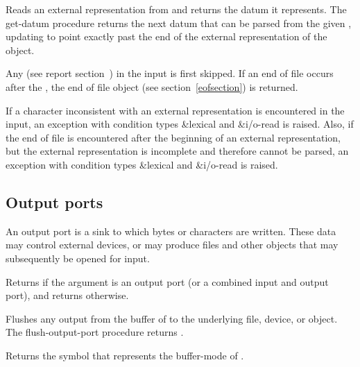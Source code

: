 \begin{entry}{%
}
 
Reads an external representation from  and returns the
datum it represents.  The {\cf get-datum} procedure returns the next
datum that can be parsed from the given , updating
 to point exactly past the end of the external
representation of the object.

Any 
(see report section~) in
the input is first skipped.  If an end of file occurs after the
, the end of file object (see
section~\ref{eofsection}) is returned.

If a character inconsistent with an external representation is
encountered in the input, an exception with condition types
{\cf\&lexical} and {\cf\&i/o-read} is raised.
Also, if the end of file is encountered
after the beginning of an external representation, but the external
representation is incomplete and therefore cannot be parsed, an exception
with condition types {\cf\&lexical} and {\cf\&i/o-read} is raised.
\end{entry}

\subsection{Output ports}

An output port is a sink to which bytes or characters are written.
These data may control
external devices, or may produce files and other objects that may
subsequently be opened for input.

\begin{entry}{%
}
   
Returns \schtrue{} if the argument is an output port (or a
combined input and output port), and returns \schfalse{} otherwise.
\end{entry}   

\begin{entry}{%
}
   
Flushes any output from the buffer of  to the
underlying file, device, or object. The {\cf flush-output-port}
procedure returns \unspecifiedreturn.
\end{entry}

\begin{entry}{%
}
   
Returns the symbol that represents the buffer-mode of
.
\end{entry}

